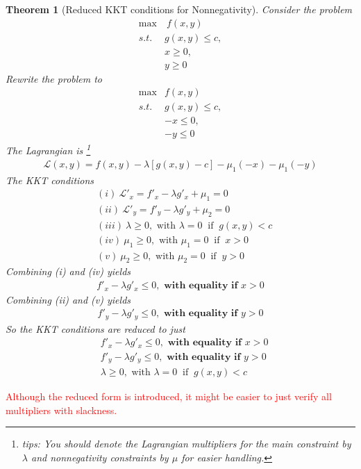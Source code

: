 \documentclass[10pt,a4paper]{book}
\newcommand{\red}[1]{\textcolor{red}{#1}}
\newtheorem{theorem}{Theorem}[section]
\theoremstyle{definition}\newtheorem{definition}{Definition}
\theoremstyle{definition}\newtheorem{fact}{Fact}
\theoremstyle{definition}\newtheorem{ex}{Ex.}
\theoremstyle{definition}\newtheorem{project}{Project}
\theoremstyle{definition}\newtheorem{problem}{Problem}
\theoremstyle{definition}\newtheorem{example}{Example}
\numberwithin{theorem}{chapter}
\numberwithin{corollary}{chapter}
\numberwithin{assumption}{chapter}
\numberwithin{definition}{chapter}
\numberwithin{prop}{chapter}
\numberwithin{notation}{chapter}
\numberwithin{problem}{chapter}
\numberwithin{example}{chapter}
\numberwithin{fact}{chapter}
\numberwithin{ex}{chapter}
\newenvironment{ftheorem}
{\begin{mdframed}\begin{theorem}}
		{\end{theorem}\end{mdframed}}
\begin{document}
	\begin{ftheorem}[Reduced KKT conditions for Nonnegativity]
			Consider the problem
		\begin{align*}
			\max &\ f(x,y)                \\
			s.t. \ & g(x,y) \leq c,                 \\
			& x \geq 0,      \\
			& y \geq 0       
		\end{align*}
		Rewrite the problem to
		\begin{align*}
			\max &f(x,y)                 \\
			s.t. & g(x,y) \leq c,                 \\
			& -x \leq 0,     \\
			& -y \leq 0      
		\end{align*}
		The Lagrangian is \footnote{tips: You should denote the Lagrangian multipliers for the main constraint by $\lambda$ and nonnegativity constraints by $\mu$ for easier handling.}
		\begin{align*}
			\mathcal{L} (x,y) = f(x,y) - \lambda [ g(x,y) - c] - \mu_1 (-x) - \mu_1 (-y) 
		\end{align*}
		The KKT conditions
		\begin{align*}
			& (i) \ \mathcal{L}'_x = f'_x - \lambda g'_x + \mu_1 = 0                       \\
			& (ii) \ \mathcal{L}'_y = f'_y - \lambda g'_y + \mu_2 = 0                      \\
			& (iii) \ \lambda \geq 0, \text{ with } \lambda = 0 \ \text{ if } \ g(x,y) < c \\
			& (iv) \ \mu_1 \geq 0, \text{ with } \mu_1 = 0 \ \text{ if } \ x > 0           \\
			& (v) \ \mu_2 \geq 0, \text{ with } \mu_2 = 0 \ \text{ if } \ y > 0            
		\end{align*}
		Combining (i) and (iv) yields
		\begin{align*}
			f'_x - \lambda g'_x \leq 0, \textbf{ with equality if $x>0$} 
		\end{align*} 
		Combining (ii) and (v) yields
		\begin{align*}
			f'_y - \lambda g'_y \leq 0, \textbf{ with equality if $y>0$} 
		\end{align*} 
		So the KKT conditions are reduced to just
		\begin{align*}
			& f'_x - \lambda g'_x \leq 0, \textbf{ with equality if $x>0$}         \\
			& f'_y - \lambda g'_y \leq 0, \textbf{ with equality if $y>0$}         \\
			& \lambda \geq 0, \text{ with } \lambda = 0 \ \text{ if } \ g(x,y) < c 
		\end{align*}
		
	\end{ftheorem}
	\red{Although the reduced form is introduced, it might be easier to just verify all multipliers with slackness.}
	
\end{document}
